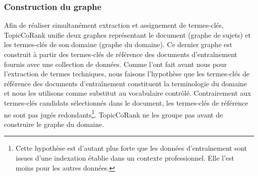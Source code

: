       \subsubsection{Construction du graphe}
      \label{subsubsec:main-domain_specific_keyphrase_annotation-supervised_automatic_keyphrase_extraction-topiccorank-graph_construction}
        Afin de réaliser simultanément extraction et assignement de termes-clés,
        TopicCoRank unifie deux graphes représentant le document (graphe de
        sujets) et les termes-clés de son domaine (graphe du domaine). Ce
        dernier graphe est construit à partir des termes-clés de référence des
        documents d'entraînement fournis avec une collection de données. Comme
         l'ont fait avant nous
        pour l'extraction de termes techniques, nous faisons l'hypothèse que les
        termes-clés de référence des documents d'entraînement constituent la
        terminologie du domaine et nous les utilisons comme substitut au
        vocabulaire contrôlé. Contrairement aux termes-clés candidats
        sélectionnés dans le document, les termes-clés de référence ne sont pas
        jugés redondants\footnote{Cette hypothèse est d'autant plus forte que
        les données d'entraînement sont issues d'une indexation établie dans un
        contexte professionnel. Elle l'est moins pour les autres données.}.
        TopicCoRank ne les groupe pas avant de construire le graphe du domaine.


